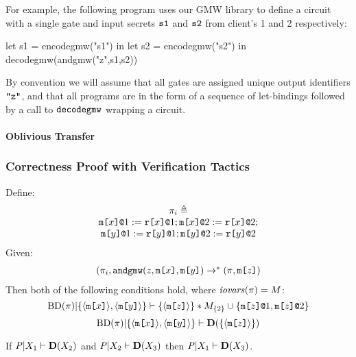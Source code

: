 For example, the following program uses our GMW library to define
a circuit with a single \eand gate and input secrets $\texttt{s1}$ and
$\texttt{s2}$ from client's 1 and 2 respectively:
\begin{verbatimtab}
         let s1 = encodegmw("s1") in
         let s2 = encodegmw("s2") in
         decodegmw(andgmw("z",s1,s2))
\end{verbatimtab}
By convention we will assume that all gates are assigned unique output
identifiers $\texttt{"z"}$, and that all programs are in the form
of a sequence of let-bindings followed by a call to $\texttt{decodegmw}$
wrapping a circuit.

\paragraph{Oblivious Transfer} 

\subsubsection{Correctness Proof with Verification Tactics}


\begin{lemma}
  Define:
  $$
  \begin{array}{c}
    \pi_{i} \triangleq \\
    \texttt{m[}x\texttt{]}\texttt{@}1 := \texttt{r[}x\texttt{]}\texttt{@}1; \texttt{m[}x\texttt{]}\texttt{@}2 := \texttt{r[}x\texttt{]}\texttt{@}2; \\
    \texttt{m[}y\texttt{]}\texttt{@}1 := \texttt{r[}y\texttt{]}\texttt{@}1; \texttt{m[}y\texttt{]}\texttt{@}2 := \texttt{r[}y\texttt{]}\texttt{@}2 
  \end{array}
  $$
  Given:
  $$
  \begin{array}{c}
  (\prog_i,\andgmw(z,\mesg{x},\mesg{y}) \redxs %
  (\prog,\mesg{z})
  \end{array}
  $$
  Then both of the following conditions hold, where $\mathit{iovars}(\pi) = M$:
  $$
  \mathrm{BD}(\pi)|\{ \langle \texttt{m[}x\texttt{]} \rangle,\langle \texttt{m[}y\texttt{]} \rangle \} \vdash \{ \langle \texttt{m[}z\texttt{]} \rangle \} * M_{\{2\}} \cup \{ \texttt{m[}z\texttt{]}\texttt{@}1,\texttt{m[}z\texttt{]}\texttt{@}2 \}
  $$
  $$
  \mathrm{BD}(\pi)|\{ \langle \texttt{m[}x\texttt{]} \rangle,\langle \texttt{m[}y\texttt{]} \rangle \} \vdash \mathbf{D}(\{ \langle \texttt{m[}z\texttt{]} \rangle \})    
  $$
\end{lemma}



\begin{lemma}
  If $\mathit{P}|X_1 \vdash \mathbf{D}(X_2)$ and
  $\mathit{P}|X_2 \vdash \mathbf{D}(X_3)$ then $\mathit{P}|X_1 \vdash \mathbf{D}(X_3)$.
\end{lemma}

